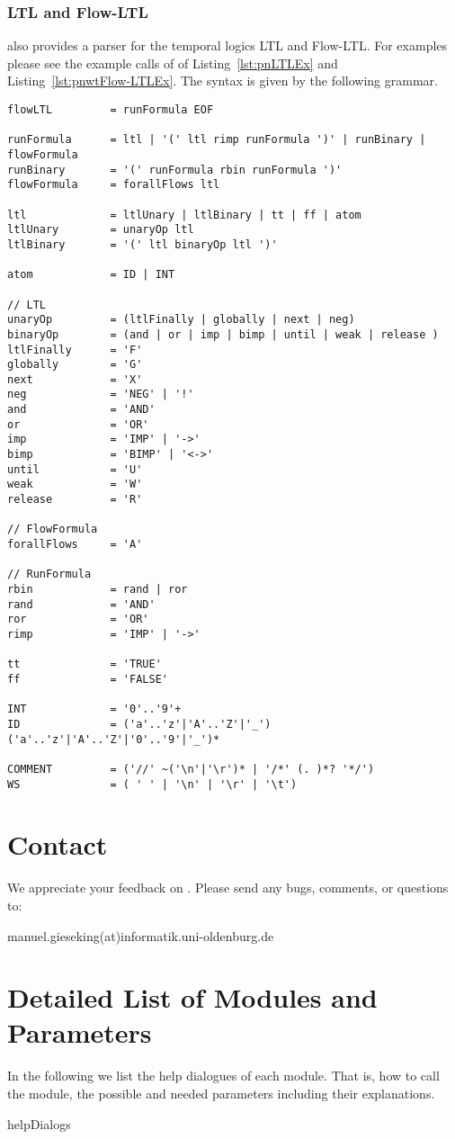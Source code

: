 \documentclass[12pt,twoside,a4paper,openright]{memoir}
\begin{document}
\subsection{LTL and Flow-LTL}
\tool{} also provides a parser for the temporal logics LTL and Flow-LTL. 
For examples please see the example calls of \tool{} of Listing~\ref{lst:pnLTLEx} and Listing~\ref{lst:pnwtFlow-LTLEx}.
The syntax is given by the following grammar.
\begin{lstlisting}[captionpos=b, caption=Grammar of the temporal logics Flow-LTL, label = lst:grammar,language=ebnf]
flowLTL 		= runFormula EOF

runFormula 		= ltl | '(' ltl rimp runFormula ')' | runBinary | flowFormula
runBinary 		= '(' runFormula rbin runFormula ')'
flowFormula 	= forallFlows ltl

ltl 			= ltlUnary | ltlBinary | tt | ff | atom
ltlUnary 		= unaryOp ltl
ltlBinary 		= '(' ltl binaryOp ltl ')'

atom 			= ID | INT

// LTL
unaryOp 		= (ltlFinally | globally | next | neg)
binaryOp 		= (and | or | imp | bimp | until | weak | release )
ltlFinally 		= 'F'
globally 		= 'G'
next 			= 'X'
neg 			= 'NEG' | '!'
and 			= 'AND'
or 				= 'OR' 
imp				= 'IMP' | '->'
bimp			= 'BIMP' | '<->'
until 			= 'U'
weak 			= 'W'
release 		= 'R'

// FlowFormula
forallFlows 	= 'A'

// RunFormula
rbin 			= rand | ror
rand 			= 'AND'
ror				= 'OR'
rimp 			= 'IMP' | '->'

tt 				= 'TRUE'
ff 				= 'FALSE'

INT 			= '0'..'9'+
ID  			= ('a'..'z'|'A'..'Z'|'_') ('a'..'z'|'A'..'Z'|'0'..'9'|'_')*

COMMENT			= ('//' ~('\n'|'\r')* | '/*' (. )*? '*/')
WS				= ( ' ' | '\n' | '\r' | '\t')
\end{lstlisting}


\chapter{Contact}
We appreciate your feedback on \tool{}. Please send any bugs, comments, or
questions to:
\begin{center}
 manuel.gieseking(at)informatik.uni-oldenburg.de
\end{center}

\appendix
\chapter{Detailed List of Modules and Parameters}
\label{app:detailedModules}
In the following we list the help dialogues of each module.
That is, how to call the module, the possible 
and needed parameters including their explanations.
\begin{subappendices}
{helpDialogs}
\end{subappendices}
\end{document}
